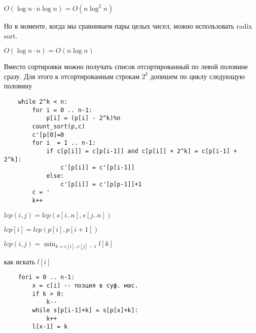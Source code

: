 \documentclass{book}
\theoremstyle{definition}
\begin{document}
$O\left( \log n \cdot  n\log n \right)  = O\left( n\log ^2n \right) $ 

Но в моменте, когда мы сравниваем пары целых чисел, можно использовать radix sort.

$O\left( \log n \cdot  n \right)  = O\left( n\log n \right) $ 

Вместо сортировки можно получать список отсортированный по левой половине сразу. Для этого к отсортированным строкам $2^k$ допишем по циклу следующую половину


\begin{lstlisting}
    while 2^k < n:
        for i = 0 .. n-1:
            p[i] = (p[i] - 2^k)%n
        count_sort(p,c)
        c'[p[0]=0
        for i  = 1 .. n-1:
            if c[p[i]] = c[p[i-1]] and c[p[i]] + 2^k] = c[p[i-1] + 2^k]:
                c'[p[i]] = c'[p[i-1]]
            else:
                c'[p[i]] = c'[p[p-1]]+1
        c = '
        k++
\end{lstlisting}

$lcp(i,j) = lcp(s[i..n], s[j..n])$

$lcp[i] = lcp\left( p[i], p[i+1] \right) $

$lcp(i,j) = \min_{k = c[i]..c[j]-1} l[k]$

как искать $l[i]$

\begin{lstlisting}
    fori = 0 .. n-1:
        x = c[i] -- позция в суф. мас.
        if k > 0:
            k--
        while s[p[i-1]+k] = s[p[x]+k]:
            k++
        l[x-1] = k
\end{lstlisting}
\end{document}
